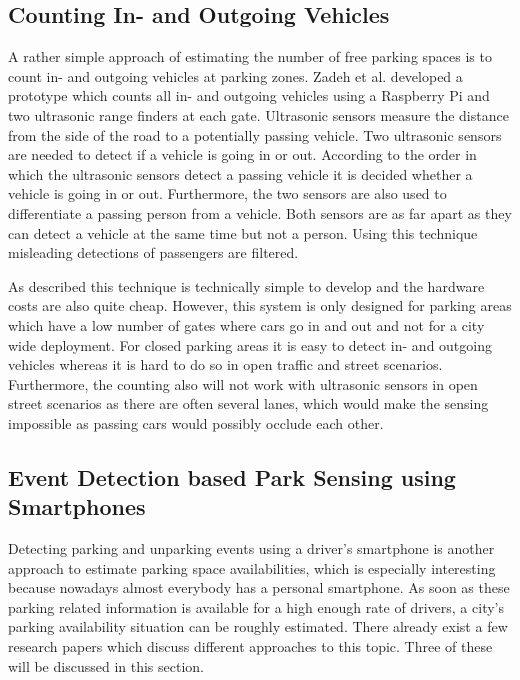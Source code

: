 \subsection{Counting In- and Outgoing Vehicles}
\label{sec:counting_in_out_park_sensing}

A rather simple approach of estimating the number of free parking spaces is to count in- and outgoing vehicles at parking zones. Zadeh et al. \cite{smarturbanparkingdetection} developed a prototype which counts all in- and outgoing vehicles using a Raspberry Pi and two ultrasonic range finders at each gate. Ultrasonic sensors measure the distance from the side of the road to a potentially passing vehicle. Two ultrasonic sensors are needed to detect if a vehicle is going in or out. According to the order in which the ultrasonic sensors detect a passing vehicle it is decided whether a vehicle is going in or out. Furthermore, the two sensors are also used to differentiate a passing person from a vehicle. Both sensors are as far apart as they can detect a vehicle at the same time but not a person. Using this technique misleading detections of passengers are filtered.

As described this technique is technically simple to develop and the hardware costs are also quite cheap. However, this system is only designed for parking areas which have a low number of gates where cars go in and out and not for a city wide deployment. For closed parking areas it is easy to detect in- and outgoing vehicles whereas it is hard to do so in open traffic and street scenarios. Furthermore, the counting also will not work with ultrasonic sensors in open street scenarios as there are often several lanes, which would make the sensing impossible as passing cars would possibly occlude each other.






\subsection{Event Detection based Park Sensing using Smartphones}
\label{sec:event_detection_park_sensing}

Detecting parking and unparking events using a driver's smartphone is another approach to estimate parking space availabilities, which is especially interesting because nowadays almost everybody has a personal smartphone. As soon as these parking related information is available for a high enough rate of drivers, a city's parking availability situation can be roughly estimated. There already exist a few research papers which discuss different approaches to this topic. Three of these will be discussed in this section.

